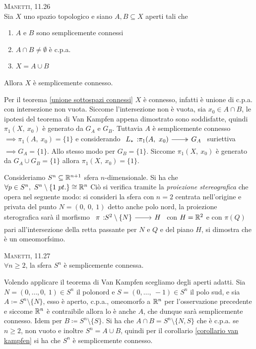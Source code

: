 \begin{corollary} \textsc{Manetti, 11.26} \label{corollario van kampfen} \\ 
	Sia $X$ uno spazio topologico e siano $A,B\subseteq X$ aperti tali che
		\begin{enumerate}
			\item $A$ e $B$ sono semplicemente connessi
			\item $A\cap B\neq\emptyset$ è c.p.a.
			\item $X=A\cup B$
		\end{enumerate}
	Allora $X$ è semplicemente connesso.
\end{corollary}
\begin{demonstration}
	Per il teorema \ref{unione sottospazi connessi} $X$ è connesso, infatti è unione di c.p.a. con intersezione non vuota.\newline
	Siccome l'intersezione non è vuota, sia $x_0\in A\cap B$, le ipotesi del teorema di Van Kampfen appena dimostrato sono soddisfatte, quindi $\pi_1(X,\ x_0)$ è generato da $G_A$ e $G_B$. Tuttavia $A$ è semplicemente connesso $\implies \pi_1(A,\ x_0)=\{1\}$ e considerando $\surr {L_\ast} {\pi_1(A,\ x_0)} {G_A}$ suriettiva $\implies G_A=\{1\}$. Allo stesso modo per $G_B=\{1\}$. Siccome $\pi_1(X,\ x_0)$ è generato da $G_A\cup G_B=\{1\}$ allora $\pi_1(X,\ x_0)=\{1\}$.
\end{demonstration}

\begin{observe}  
	Consideriamo $S^n\subseteq \mathbb{R}^{n+1}$ sfera $n$-dimensionale. Si ha che $\forall p\in S^n,\ S^n\setminus \{1 \ pt.\}\cong \mathbb{R}^n$\newline
	Ciò si verifica tramite la \textit{proiezione stereografica} che opera nel seguente modo: si consideri la sfera con $n=2$ centrata nell'origine e privata del punto $N=(0,\ 0,\ 1)$ detto anche polo nord, la proiezione sterografica sarà il morfismo $\funz \pi {S^2\setminus\{N\}} H$ con $H=\mathbb{R}^2$ e con $\pi(Q)$ pari all'intersezione della retta passante per $N$ e $Q$ e del piano $H$, si dimostra che è un omeomorfsimo.
\end{observe}

\begin{corollary} \textsc{Manetti, 11.27} \label{sfere sempl. connesse} \\
	$\forall n\geq 2$, la sfera $S^n$ è semplicemente connessa.
\end{corollary}
\begin{demonstration}
	Volendo applicare il teorema di Van Kampfen scegliamo degli aperti adatti.\newline
	Sia $N=(0,\dots,0,\ 1)\in S^n$ il polonord e $S=(0,\dots,\ -1)\in S^n$ il polo sud, e sia $A\coloneqq S^n\setminus\{N\}$, esso è aperto, c.p.a., omeomorfo a $\mathbb{R}^n$ per l'osservazione precedente e siccome $\mathbb{R}^n$ è contraibile allora lo è anche $A$, che dunque sarà semplicemente connesso. Idem per $B\coloneqq S^n\setminus\{S\}$. Si ha che $A\cap B=S^n\setminus\{N, S\}$ che è c.p.a. se $n\geq 2$, non vuoto e inoltre $S^n=A\cup B$, quindi per il corollario \ref{corollario van kampfen} si ha che $S^n$ è semplicemente connesso.
\end{demonstration}

